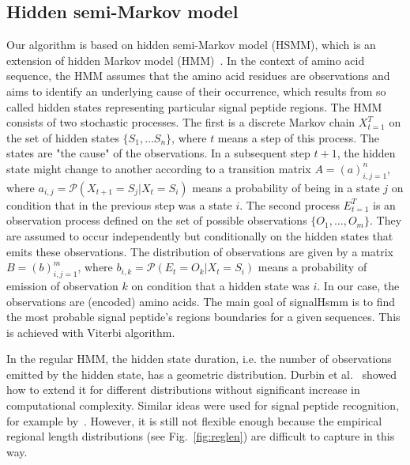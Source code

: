 \documentclass[10pt,letterpaper]{article}
\begin{document}
\subsection*{Hidden semi-Markov model}
Our algorithm is based on hidden semi-Markov model (HSMM), which is an extension of hidden Markov model (HMM)~\cite{1989rabinera}. In the context of amino acid sequence, the HMM assumes that the amino acid residues are observations and aims to identify an underlying cause of their occurrence, which results from so called hidden states representing particular signal peptide regions. The HMM consists of two stochastic processes. The first is a discrete Markov chain $X_{t=1}^T$ on the set of  hidden states $\{S_1, \dots S_n\}$, where $t$ means a step of this process. The states are "the cause" of the observations. In a subsequent step $t+1$, the hidden state might change to another according to a transition matrix $A = (a)_{i,j=1}^n$, where $a_{i,j} = \mathcal{P}(X_{t+1} = S_j | X_t = S_i)$ means a probability of being in a state $j$ on condition that in the previous step was a state $i$. The second process $E_{t=1}^T$ is an observation process defined on the set of possible observations $\{O_1, \dots, O_m\}$. They are assumed to occur independently but conditionally on the hidden states that emits these observations. 
The distribution of observations are given by a matrix $B = (b)_{i,j=1}^m$, where $b_{i,k} = \mathcal{P}(E_t = O_k | X_t = S_i)$ means a probability of emission of observation $k$ on condition that a hidden state was $i$. In our case, the observations are (encoded) amino acids.
The main goal of signalHsmm is to find the most probable signal peptide's regions boundaries for a given sequences. This is achieved with Viterbi algorithm.

In the regular HMM, the hidden state duration, i.e. the number of observations emitted by the hidden state, has a geometric distribution. Durbin et al.~\cite{Durbin98} showed how to extend it for different distributions without significant increase in computational 
complexity. Similar ideas were used for signal peptide recognition, for example by~\cite{2004klla}. However, it is still not flexible enough because the empirical regional length distributions (see Fig.~\ref{fig:reglen}) are difficult to capture in this way.
\end{document}
